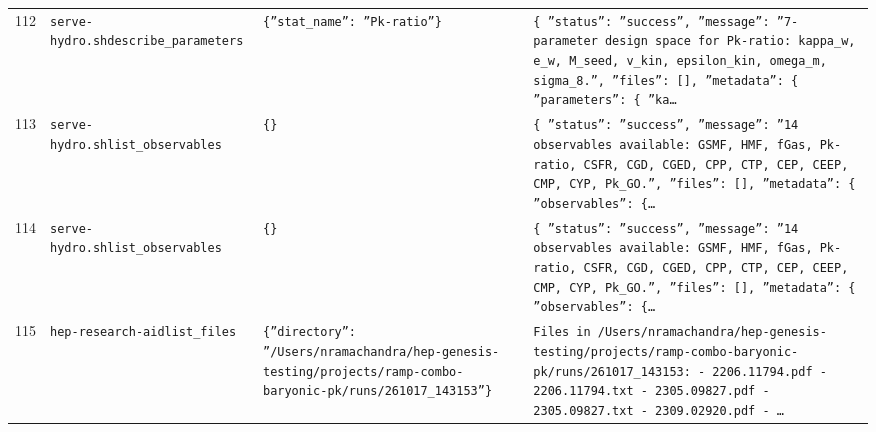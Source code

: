 \documentclass[11pt,a4paper]{article}
\begin{document}
\begin{longtable}{@{}p{}p{}p{}p{}@{}}
112 & \texttt{serve-hydro.sh}\newline\texttt{describe\_\allowbreak{}parameters} & \texttt{\{''stat\_\allowbreak{}name'':\allowbreak{} ''Pk-ratio''\}\allowbreak{}} & \texttt{\{   ''status'':\allowbreak{} ''success'',\allowbreak{}   ''message'':\allowbreak{} ''7-parameter design space for Pk-ratio:\allowbreak{} kappa\_\allowbreak{}w,\allowbreak{} e\_\allowbreak{}w,\allowbreak{} M\_\allowbreak{}seed,\allowbreak{} v\_\allowbreak{}kin,\allowbreak{} epsilon\_\allowbreak{}kin,\allowbreak{} omega\_\allowbreak{}m,\allowbreak{} sigma\_\allowbreak{}8.'',\allowbreak{}   ''files'':\allowbreak{} []\allowbreak{},\allowbreak{}   ''metadata'':\allowbreak{} \{     ''parameters'':\allowbreak{} \{       ''ka\ldots{}\allowbreak{}} \\
113 & \texttt{serve-hydro.sh}\newline\texttt{list\_\allowbreak{}observables} & \texttt{\{\}\allowbreak{}} & \texttt{\{   ''status'':\allowbreak{} ''success'',\allowbreak{}   ''message'':\allowbreak{} ''14 observables available:\allowbreak{} GSMF,\allowbreak{} HMF,\allowbreak{} fGas,\allowbreak{} Pk-ratio,\allowbreak{} CSFR,\allowbreak{} CGD,\allowbreak{} CGED,\allowbreak{} CPP,\allowbreak{} CTP,\allowbreak{} CEP,\allowbreak{} CEEP,\allowbreak{} CMP,\allowbreak{} CYP,\allowbreak{} Pk\_\allowbreak{}GO.'',\allowbreak{}   ''files'':\allowbreak{} []\allowbreak{},\allowbreak{}   ''metadata'':\allowbreak{} \{     ''observables'':\allowbreak{} \{\ldots{}\allowbreak{}} \\
114 & \texttt{serve-hydro.sh}\newline\texttt{list\_\allowbreak{}observables} & \texttt{\{\}\allowbreak{}} & \texttt{\{   ''status'':\allowbreak{} ''success'',\allowbreak{}   ''message'':\allowbreak{} ''14 observables available:\allowbreak{} GSMF,\allowbreak{} HMF,\allowbreak{} fGas,\allowbreak{} Pk-ratio,\allowbreak{} CSFR,\allowbreak{} CGD,\allowbreak{} CGED,\allowbreak{} CPP,\allowbreak{} CTP,\allowbreak{} CEP,\allowbreak{} CEEP,\allowbreak{} CMP,\allowbreak{} CYP,\allowbreak{} Pk\_\allowbreak{}GO.'',\allowbreak{}   ''files'':\allowbreak{} []\allowbreak{},\allowbreak{}   ''metadata'':\allowbreak{} \{     ''observables'':\allowbreak{} \{\ldots{}\allowbreak{}} \\
115 & \texttt{hep-research-aid}\newline\texttt{list\_\allowbreak{}files} & \texttt{\{''directory'':\allowbreak{} ''/\allowbreak{}Users/\allowbreak{}nramachandra/\allowbreak{}hep-genesis-testing/\allowbreak{}projects/\allowbreak{}ramp-combo-baryonic-pk/\allowbreak{}runs/\allowbreak{}261017\_\allowbreak{}143153''\}\allowbreak{}} & \texttt{Files in /\allowbreak{}Users/\allowbreak{}nramachandra/\allowbreak{}hep-genesis-testing/\allowbreak{}projects/\allowbreak{}ramp-combo-baryonic-pk/\allowbreak{}runs/\allowbreak{}261017\_\allowbreak{}143153:\allowbreak{}   - 2206.11794.pdf   - 2206.11794.txt   - 2305.09827.pdf   - 2305.09827.txt   - 2309.02920.pdf   - \ldots{}\allowbreak{}} \\

\end{longtable}
\end{document}
